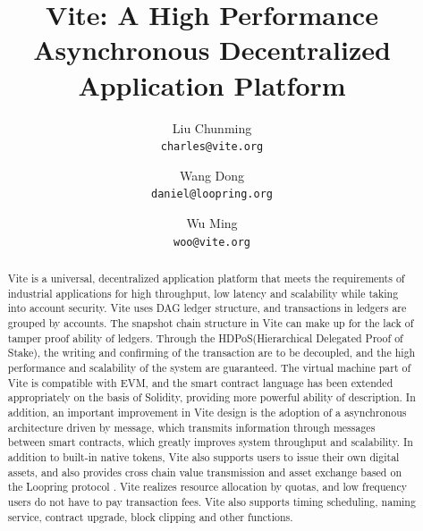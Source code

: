 \documentclass[UTF8,nofonts]{article}
\title{\textbf{Vite: A High Performance Asynchronous Decentralized Application Platform}}
\author{
  Liu Chunming\\
  \texttt{charles@vite.org}\\
  \and
  Wang Dong\\
  \texttt{daniel@loopring.org}\\
  \and
  Wu Ming\\
  \texttt{woo@vite.org}\\
 }
\date{}
\begin{document}
\maketitle

\begin{abstract}
Vite is a universal, decentralized application platform that meets the requirements of industrial applications for high throughput, low latency and scalability while taking into account security. Vite uses DAG ledger structure, and transactions in ledgers are grouped by accounts. The snapshot chain structure in Vite can make up for the lack of tamper proof ability of ledgers. Through the HDPoS(Hierarchical Delegated Proof of Stake), the writing and confirming of the transaction are to be decoupled, and the high performance and scalability of the system are guaranteed. The virtual machine part of Vite is compatible with EVM, and the smart contract language has been extended appropriately on the basis of Solidity, providing more powerful ability of description. In addition, an important improvement in Vite design is the adoption of a asynchronous architecture driven by message, which transmits information through messages between smart contracts, which greatly improves system throughput and scalability. In addition to built-in native tokens, Vite also supports users to issue their own digital assets, and also provides cross chain value transmission and asset exchange based on the Loopring protocol \cite{loopring}. Vite realizes resource allocation by quotas, and low frequency users do not have to pay transaction fees. Vite also supports timing scheduling, naming service, contract upgrade, block clipping and other functions.

\end{abstract}
\end{document}
